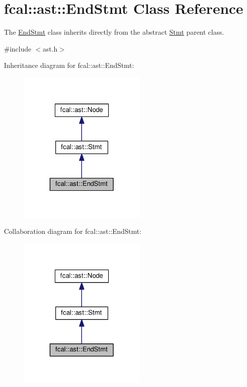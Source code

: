 \hypertarget{classfcal_1_1ast_1_1EndStmt}{}\section{fcal\+:\+:ast\+:\+:End\+Stmt Class Reference}
\label{classfcal_1_1ast_1_1EndStmt}


The \hyperlink{classfcal_1_1ast_1_1EndStmt}{End\+Stmt} class inherits directly from the abstract \hyperlink{classfcal_1_1ast_1_1Stmt}{Stmt} parent class.  




{\ttfamily \#include $<$ast.\+h$>$}



Inheritance diagram for fcal\+:\+:ast\+:\+:End\+Stmt\+:
\nopagebreak
\begin{figure}[H]
\begin{center}
\leavevmode
\includegraphics[width=176pt]{classfcal_1_1ast_1_1EndStmt__inherit__graph}
\end{center}
\end{figure}


Collaboration diagram for fcal\+:\+:ast\+:\+:End\+Stmt\+:
\nopagebreak
\begin{figure}[H]
\begin{center}
\leavevmode
\includegraphics[width=176pt]{classfcal_1_1ast_1_1EndStmt__coll__graph}
\end{center}
\end{figure}
